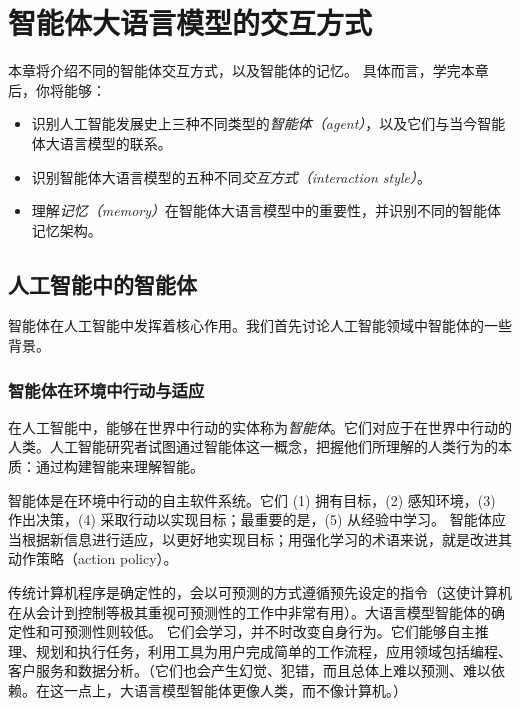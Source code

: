 \chapter{智能体大语言模型的交互方式}\label{chap:agents}



\begin{learningbox}
本章将介绍不同的智能体交互方式，以及智能体的记忆。
具体而言，学完本章后，你将能够：
\begin{itemize}[leftmargin=*, nosep]
    \item 识别人工智能发展史上三种不同类型的{\em 智能体（agent）}，以及它们与当今智能体大语言模型的联系。

    \item 识别智能体大语言模型的五种不同{\em 交互方式（interaction style）}。

    \item 理解{\em 记忆（memory）}在智能体大语言模型中的重要性，并识别不同的智能体记忆架构。

\end{itemize}
\end{learningbox}






\section{人工智能中的智能体}
智能体在人工智能中发挥着核心作用。我们首先讨论人工智能领域中智能体的一些背景。

\subsection{智能体在环境中行动与适应}
在人工智能中，能够在世界中行动的实体称为{\em 智能体}。它们对应于在世界中行动的人类。人工智能研究者试图通过智能体这一概念，把握他们所理解的人类行为的本质：通过构建智能来理解智能。

智能体是在环境中行动的自主软件系统。它们 (1) 拥有目标，(2) 感知环境，(3) 作出决策，(4) 采取行动以实现目标；最重要的是，(5) 从经验中学习。
智能体应当根据新信息进行适应，以更好地实现目标；用强化学习的术语来说，就是改进其动作策略（action policy）。

传统计算机程序是确定性的，会以可预测的方式遵循预先设定的指令（这使计算机在从会计到控制等极其重视可预测性的工作中非常有用）。大语言模型智能体的确定性和可预测性则较低。
它们会学习，并不时改变自身行为。它们能够自主推理、规划和执行任务，利用工具为用户完成简单的工作流程，应用领域包括编程、客户服务和数据分析。（它们也会产生幻觉、犯错，而且总体上难以预测、难以依赖。在这一点上，大语言模型智能体更像人类，而不像计算机。）

